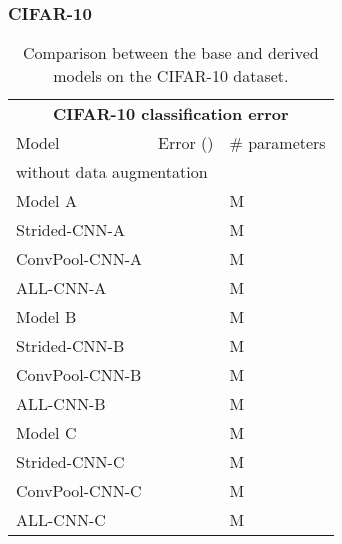 \documentclass{article} \usepackage{iclr2015,times}
\begin{document}
\subsubsection{CIFAR-10}
\begin{table}[h]
\caption{Comparison between the base and derived models on the CIFAR-10 dataset.}
\label{results-cifar10-base}
\begin{center}
\begin{tabular}{lll}
\multicolumn{3}{c}{\bf CIFAR-10 classification error} \\
\multicolumn{1}{l}{Model} & \multicolumn{1}{l}{Error ()} & \multicolumn{1}{l}{\# parameters} \\
\hline
\multicolumn{3}{l}{without data augmentation} \\
\hline
Model A         &   &  M \\
Strided-CNN-A         &   &  M \\
ConvPool-CNN-A         &   &  M \\
ALL-CNN-A         &   &  M \\
\hline
Model B         &   &  M \\
Strided-CNN-B         &   &  M \\
ConvPool-CNN-B         &   &  M \\
ALL-CNN-B         &   &  M \\
\hline
Model C         &   &  M \\
Strided-CNN-C         &   &  M \\
ConvPool-CNN-C         &   &  M \\
ALL-CNN-C         &   &  M \\
\end{tabular}
\end{center}
\end{table}
\end{document}
